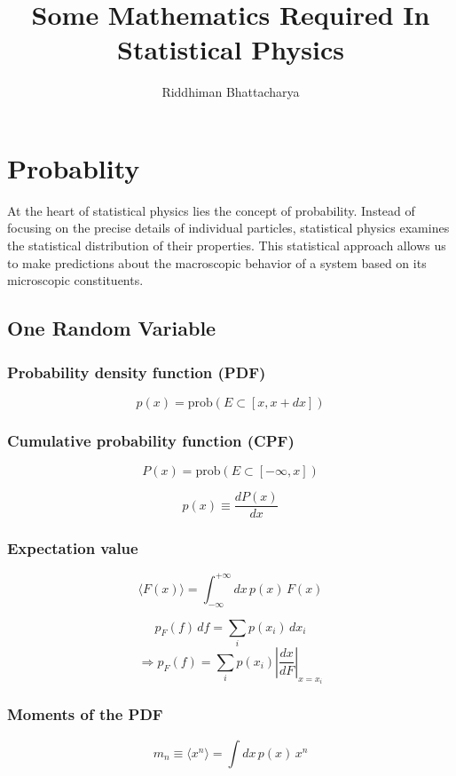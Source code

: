 \documentclass{article}
\title{\textbf{Some Mathematics Required In Statistical Physics}}
\author{Riddhiman Bhattacharya}
\begin{document}
\maketitle


\section{Probablity}
At the heart of statistical physics lies the concept of probability. Instead of focusing
on the precise details of individual particles, statistical physics examines the statistical
distribution of their properties. This statistical approach allows us to make predictions
about the macroscopic behavior of a system based on its microscopic constituents. 

\subsection{One Random Variable}
\subsubsection{Probability density function (PDF)}

$$ p(x) = \text{prob}(E \subset [x, x + dx])$$


\subsubsection{Cumulative probability function (CPF)}

$$ P(x) = \text{prob}(E \subset [-\infty, x])$$

$$ p(x) \equiv \frac{dP(x)}{dx} $$


\subsubsection{Expectation value}

$$\langle F(x) \rangle = \int_{-\infty}^{+\infty} dx \, p(x) \, F(x) $$

$$p_F(f) \, df = \sum_i p(x_i) \, dx_i
$$
$$\Longrightarrow
 p_F(f) = \sum_i p(x_i) \left| \frac{dx}{dF} \right|_{x=x_i} $$



\subsubsection{Moments of the PDF}

$$m_n \equiv \langle x^n \rangle = \int dx \, p(x) \, x^n $$
\end{document}
